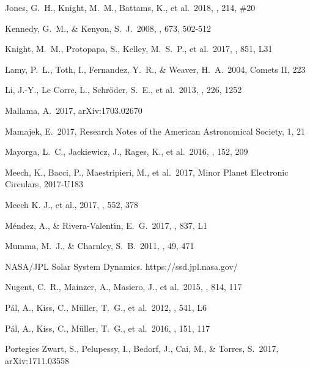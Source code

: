 \documentclass[a4paper,fleqn,usenatbib]{mnras}
\begin{document}
\begin{thebibliography}{99}
 Jones, G.~H., Knight, M.~M., Battams, K., et al.\ 2018, \ssr, 214, \#20 

 Kennedy, G.~M., \& Kenyon, S.~J.\ 2008, \apj, 673, 502-512 

 Knight, M.~M., Protopapa, S., Kelley, M.~S.~P., et al.\ 2017, \apjl, 851, L31 

 Lamy, P.~L., Toth, I., Fernandez, Y.~R., \& Weaver, H.~A.\ 2004, Comets II, 223 

 Li, J.-Y., Le Corre, L., Schr{\"o}der, S.~E., et al.\ 2013, \icarus, 226, 1252 

 Mallama, A.\ 2017, arXiv:1703.02670 

 Mamajek, E.\ 2017, Research Notes of the American Astronomical Society, 1, 21 

 Mayorga, L.~C., Jackiewicz, J., Rages, K., et al.\ 2016, \aj, 152, 209 

 Meech, K., Bacci, P., Maestripieri, M., et al.\ 2017, Minor Planet Electronic Circulars, 2017-U183

 Meech K. J., et al., 2017, \nat, 552, 378

 M{\'e}ndez, A., \& Rivera-Valent{\'{\i}}n, E.~G.\ 2017, \apjl, 837, L1 

 Mumma, M.~J., \& Charnley, S.~B.\ 2011, \araa, 49, 471 

 NASA/JPL Solar System Dynamics. https://ssd.jpl.nasa.gov/

 Nugent, C.~R., Mainzer, A., Masiero, J., et al.\ 2015, \apj, 814, 117 

 P{\'a}l, A., Kiss, C., M{\"u}ller, T.~G., et al.\ 2012, \aap, 541, L6 

 P{\'a}l, A., Kiss, C., M{\"u}ller, T.~G., et al.\ 2016, \aj, 151, 117 

 Portegies Zwart, S., Pelupessy, I., Bedorf, J., Cai, M., \& Torres, S.\ 2017, arXiv:1711.03558


\end{thebibliography}
\end{document}
